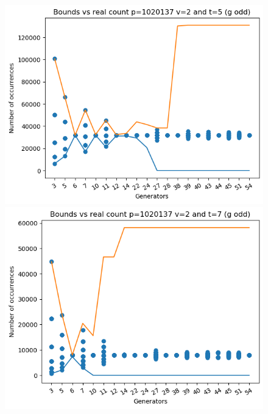 \documentclass{article}
\begin{document}
\begin{figure}[H]
\begin{minipage}{.49\textwidth}
            \includegraphics[width=\textwidth]{../plots/tuples_figures/1020137v2godd/test_p1020137_v2_t5_g_odd.png}
            \includegraphics[width=\textwidth]{../plots/tuples_figures/1020137v2godd/test_p1020137_v2_t7_g_odd.png}
    \end{minipage}
\end{figure}
\end{document}
